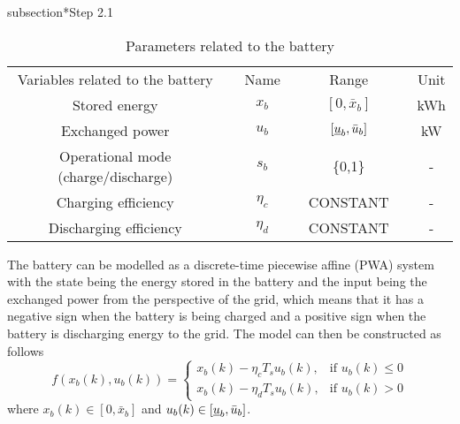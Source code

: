subsection*{Step 2.1}
\begin{table}[]
\centering
\begin{tabular}{clclclc}
Variables related to the battery &  & Name &  & Range &  & Unit \\ \cline{1-1} \cline{3-3} \cline{5-5} \cline{7-7} 
Stored energy &  & $x_b$ &  & $[0,\bar{x}_b]$ &  & kWh \\
Exchanged power &  & $u_b$ &  & $[\underbar{$u$}_b,\bar{u}_b]$ &  & kW \\
Operational mode (charge/discharge) &  & $s_b$ &  & \{0,1\} &  & - \\
Charging efficiency &  & $\eta_c$ &  & CONSTANT &  & - \\
Discharging efficiency &  & $\eta_d$ &  & CONSTANT &  & -
\end{tabular}
\caption{Parameters related to the battery}
\label{batteryParm}
\end{table}

The battery can be modelled as a discrete-time piecewise affine (PWA) system with the state being the energy stored in the battery and the input being the exchanged power from the perspective of the grid, which means that it has a negative sign when the battery is being charged and a positive sign when the battery is discharging energy to the grid. The model can then be constructed as follows
\begin{equation*}
f(x_b(k),u_b(k)) =\left\{\begin{matrix}
x_b(k)-\eta_c T_s u_b(k), & \text{if } u_b(k) \leq 0 \\
x_b(k)-\eta_d T_s u_b(k), & \text{if } u_b(k) > 0 
\end{matrix}\right.
\end{equation*}
where $x_b(k) \in [0,\bar{x}_b]$ and $u_b(k) \in [\underbar{$u$}_b, \bar{u}_b]$.
